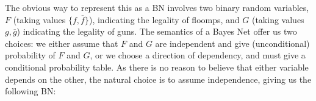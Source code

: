 \documentclass{article}
\numberwithin{equation}{section}
\begin{document}
\begin{notfocus}
\begin{example}
		The obvious way to represent this as a BN involves two binary random variables, $F$ (taking values $\{f, \overline f\}$), indicating the legality of floomps, and $G$ (taking values $g, \overline g$) indicating the legality of guns. 
		The semantics of a Bayes Net offer us two choices:
		we either assume that $F$ and $G$ are independent and give
		(unconditional) probability of $F$ and $G$, or we choose a
		direction of dependency,
                and must give a conditional probability table.           
		As there is no reason to believe that either variable depends on the
		other, the natural choice is to assume independence, giving us the
		following BN:
		
		
		\begin{center}
		\end{center}
		

\end{example}
\end{notfocus}
\end{document}
